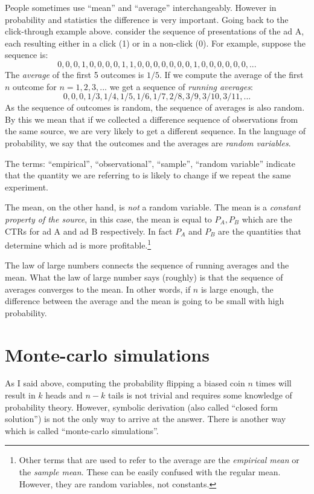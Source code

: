 People sometimes use ``mean'' and ``average'' interchangeably. However
in probability and statistics the difference is very important. Going back to the
click-through example above. consider the sequence of presentations of
the ad A, each resulting either in a click (1) or in a non-click
(0). For example, suppose the sequence is:
\[
0,0,0,1,0,0,0,0,1,1,0,0,0,0,0,0,0,1,0,0,0,0,0,0,...
\] 
The {\em average} of the first 5 outcomes is $1/5$. If we compute
the average of the first $n$ outcome for $n=1,2,3,...$ we get a
sequence of {\em running averages}:
\[
0,0,0,1/3,1/4,1/5,1/6,1/7,2/8,3/9,3/10,3/11,...
\]
As the sequence of outcomes is random, the sequence of averages is
also random. By this we mean that if we collected a difference
sequence of observations from the same source, we are very likely to
get a different sequence. In the language of probability, we say that
the outcomes and the averages are {\em random variables}.

The terms: ``empirical'', ``observational'', ``sample'', ``random
variable'' indicate that the quantity we are referring to is likely to
change if we repeat the same experiment.

The mean, on the other hand, is {\em not} a random variable. The mean
is a {\em constant property of the source}, in this case, the mean is
equal to $P_A,P_B$ which are the CTRs for ad A and ad B
respectively. In fact $P_A$ and $P_B$ are the quantities that
determine which ad is more profitable.\footnote{Other terms that are
  used to refer to the average are the {\em empirical mean} or the
  {\em sample mean}. These can be easily confused with the regular
  mean. However, they are random variables, not constants.}

The law of large numbers connects the sequence of running averages and
the mean. What the law of large number says (roughly) is that the
sequence of averages converges to the mean. In other words, if $n$ is
large enough, the difference between the average and the mean is going
to be small with high probability.

\section{Monte-carlo simulations}
As I said above, computing the probability flipping a biased coin $n$
times will result in $k$ heads and $n-k$ tails is not
trivial and requires some knowledge of probability theory. However,
symbolic derivation (also called ``closed form solution'') is not the
only way to arrive at the answer. There is another way which is called
``monte-carlo simulations''.

